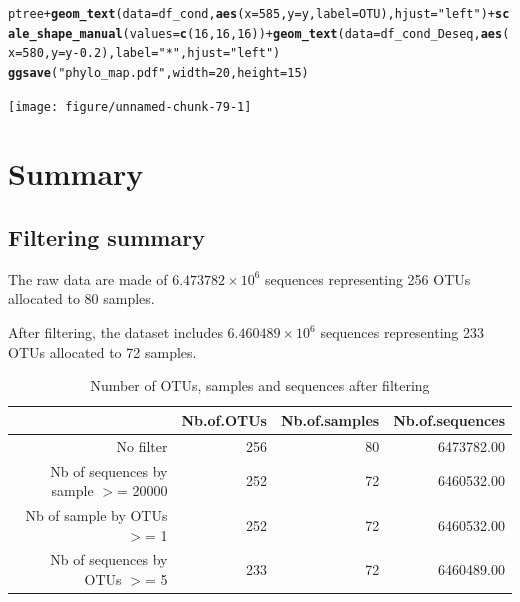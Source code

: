 \documentclass[12pt]{article}\usepackage[]{graphicx}\usepackage[]{color}
\makeatletter
\newcommand{\hlnum}[1]{\textcolor[rgb]{0.686,0.059,0.569}{#1}}%
\newcommand{\hlstr}[1]{\textcolor[rgb]{0.192,0.494,0.8}{#1}}%
\newcommand{\hlopt}[1]{\textcolor[rgb]{0,0,0}{#1}}%
\newcommand{\hlstd}[1]{\textcolor[rgb]{0.345,0.345,0.345}{#1}}%
\newcommand{\hlkwc}[1]{\textcolor[rgb]{0.333,0.667,0.333}{#1}}%
\newcommand{\hlkwd}[1]{\textcolor[rgb]{0.737,0.353,0.396}{\textbf{#1}}}%
\newenvironment{kframe}{%
 \def\at@end@of@kframe{}%
 \ifinner\ifhmode%
  \def\at@end@of@kframe{\end{minipage}}%
  \begin{minipage}{\columnwidth}%
 \fi\fi%
 \def\FrameCommand##1{\hskip\@totalleftmargin \hskip-\fboxsep
 \colorbox{shadecolor}{##1}\hskip-\fboxsep
     \hskip-\linewidth \hskip-\@totalleftmargin \hskip\columnwidth}%
 \MakeFramed {\advance\hsize-\width
   \@totalleftmargin\z@ \linewidth\hsize
   \@setminipage}}%
 {\par\unskip\endMakeFramed%
 \at@end@of@kframe}
\newenvironment{knitrout}{}{} %
\numberwithin{figure}{section}
\makeatother
\begin{document}
\begin{knitrout}\small
{}\color{fgcolor}\begin{kframe}
\begin{alltt}
\hlstd{ptree} \hlopt{+} \hlkwd{geom_text}\hlstd{(}\hlkwc{data} \hlstd{= df_cond,} \hlkwd{aes}\hlstd{(}\hlkwc{x} \hlstd{=} \hlnum{585}\hlstd{,} \hlkwc{y} \hlstd{= y,} \hlkwc{label} \hlstd{= OTU),} \hlkwc{hjust} \hlstd{=} \hlstr{"left"}\hlstd{)} \hlopt{+} \hlkwd{scale_shape_manual}\hlstd{(}\hlkwc{values} \hlstd{=} \hlkwd{c}\hlstd{(}\hlnum{16}\hlstd{,} \hlnum{16}\hlstd{,} \hlnum{16}\hlstd{))} \hlopt{+} \hlkwd{geom_text}\hlstd{(}\hlkwc{data} \hlstd{= df_cond_Deseq,} \hlkwd{aes}\hlstd{(}\hlkwc{x} \hlstd{=} \hlnum{580}\hlstd{,} \hlkwc{y} \hlstd{= y}\hlopt{-}\hlnum{0.2}\hlstd{),} \hlkwc{label} \hlstd{=} \hlstr{"*"}\hlstd{,} \hlkwc{hjust} \hlstd{=} \hlstr{"left"}\hlstd{)}
\hlkwd{ggsave}\hlstd{(}\hlstr{"phylo_map.pdf"}\hlstd{,}  \hlkwc{width} \hlstd{=} \hlnum{20}\hlstd{,} \hlkwc{height} \hlstd{=} \hlnum{15}\hlstd{)}
\end{alltt}
\end{kframe}

{\centering \texttt{[image: figure/unnamed-chunk-79-1]} 

}



\end{knitrout}



\section{Summary}
\label{sect:summary}

  \subsection{Filtering summary}

The raw data are made of \ensuremath{6.473782\times 10^{6}} sequences representing 256 OTUs allocated to 80 samples.

After filtering, the dataset includes \ensuremath{6.460489\times 10^{6}} sequences representing 233 OTUs allocated to 72 samples.

\begin{table}[ht]
\centering
\begin{tabular}{rrrr}
  \hline
 & Nb.of.OTUs & Nb.of.samples & Nb.of.sequences \\ 
  \hline
No filter & 256 &  80 & 6473782.00 \\ 
  Nb of sequences by sample $>$=  20000 & 252 &  72 & 6460532.00 \\ 
  Nb of sample by OTUs $>$=  1 & 252 &  72 & 6460532.00 \\ 
  Nb of sequences by OTUs $>$=  5 & 233 &  72 & 6460489.00 \\ 
   \hline
\end{tabular}
\caption{Number of OTUs, samples and sequences after filtering} 
\end{table}
\end{document}
